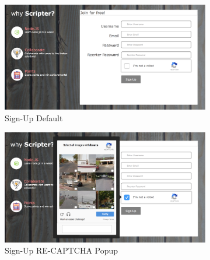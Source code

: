 \documentclass[a4paper]{article}
\begin{document}
\begin{figure}[h!]
  \centering
  \begin{subfigure}[b]{0.45\linewidth}
    \includegraphics[width=\linewidth]{images/signup-default.png}
    \caption{Sign-Up Default}
    \label{fig:signup_default}
  \end{subfigure}
    \begin{subfigure}[b]{0.45\linewidth}
    \includegraphics[width=\linewidth]{images/signup-captcha.png}
    \caption{Sign-Up RE-CAPTCHA Popup}
    \label{fig:signup_popup}
  \end{subfigure}
  \caption{}
\end{figure}
\end{document}
